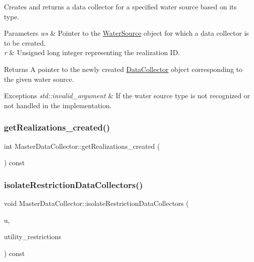 Creates and returns a data collector for a specified water source based on its type. 


\begin{DoxyParams}{Parameters}
{\em ws} & Pointer to the {\ttfamily \mbox{\hyperlink{classWaterSource}{Water\+Source}}} object for which a data collector is to be created. \\
\hline
{\em r} & Unsigned long integer representing the realization ID.\\
\hline
\end{DoxyParams}
\begin{DoxyReturn}{Returns}
A pointer to the newly created {\ttfamily \mbox{\hyperlink{classDataCollector}{Data\+Collector}}} object corresponding to the given water source.
\end{DoxyReturn}

\begin{DoxyExceptions}{Exceptions}
{\em std\+::invalid\+\_\+argument} & If the water source type is not recognized or not handled in the implementation. \\
\hline
\end{DoxyExceptions}
\mbox{\label{classMasterDataCollector_afa654d3fbf2e86692d3ccedf891265b1}} 
\subsubsection{\texorpdfstring{get\+Realizations\+\_\+created()}{getRealizations\_created()}}
{\footnotesize\ttfamily int Master\+Data\+Collector\+::get\+Realizations\+\_\+created (\begin{DoxyParamCaption}{ }\end{DoxyParamCaption}) const}

\mbox{\label{classMasterDataCollector_a640eed0cb3e00679463601adbdd3d1e6}} 
\subsubsection{\texorpdfstring{isolate\+Restriction\+Data\+Collectors()}{isolateRestrictionDataCollectors()}}
{\footnotesize\ttfamily void Master\+Data\+Collector\+::isolate\+Restriction\+Data\+Collectors (\begin{DoxyParamCaption}\item[{vector$<$ \mbox{\hyperlink{classUtilitiesDataCollector}{Utilities\+Data\+Collector}} $\ast$$>$ \&}]{u,  }\item[{vector$<$ \mbox{\hyperlink{classRestrictionsDataCollector}{Restrictions\+Data\+Collector}} $\ast$$>$ \&}]{utility\+\_\+restrictions }\end{DoxyParamCaption}) const}

